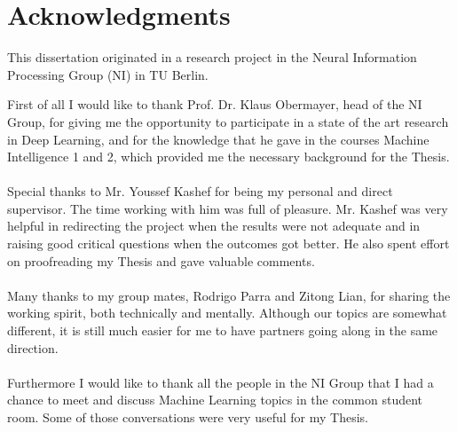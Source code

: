 


\chapter*{Acknowledgments}

\noindent This dissertation originated in a research project in the Neural Information
Processing Group (NI) in TU Berlin.

\vspace*{1cm}
\noindent 
First of all I would like to thank Prof. Dr. Klaus Obermayer, head of the NI Group, for
giving me the opportunity to participate in a state of the art research in Deep Learning,
and for the knowledge that he gave in the courses Machine Intelligence 1 and 2, which
provided me the necessary background for the Thesis.
\\ 
\\
Special thanks to Mr. Youssef Kashef for being my personal and direct supervisor. The time
working with him was full of pleasure. Mr. Kashef was very helpful in redirecting the
project when the results were not adequate and in raising good critical questions when
the outcomes got better. He also spent effort on proofreading my Thesis and gave valuable
comments.
\\
\\ 
Many thanks to my group mates, Rodrigo Parra and Zitong Lian, for sharing the working
spirit, both technically and mentally. Although our topics are somewhat different, it is
still much easier for me to have partners going along in the same direction.
\\ 
\\
Furthermore I would like to thank all the people in the NI Group that I had a chance to
meet and discuss Machine Learning topics in the common student room. Some of those
conversations were very useful for my Thesis.
